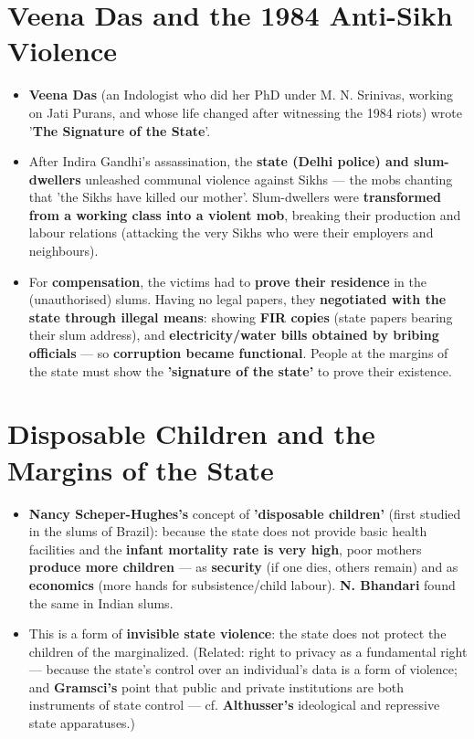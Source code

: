 \section{Veena Das and the 1984 Anti-Sikh Violence}

\begin{KeyConcept}
\begin{itemize}
\item \textbf{Veena Das} (an Indologist who did her PhD under M. N. Srinivas, working on Jati Purans, and whose life changed after witnessing the 1984 riots) wrote '\textbf{The Signature of the State}'.
\item After Indira Gandhi's assassination, the \textbf{state (Delhi police) and slum-dwellers} unleashed communal violence against Sikhs --- the mobs chanting that 'the Sikhs have killed our mother'. Slum-dwellers were \textbf{transformed from a working class into a violent mob}, breaking their production and labour relations (attacking the very Sikhs who were their employers and neighbours).
\item For \textbf{compensation}, the victims had to \textbf{prove their residence} in the (unauthorised) slums. Having no legal papers, they \textbf{negotiated with the state through illegal means}: showing \textbf{FIR copies} (state papers bearing their slum address), and \textbf{electricity/water bills obtained by bribing officials} --- so \textbf{corruption became functional}. People at the margins of the state must show the \textbf{'signature of the state'} to prove their existence.
\end{itemize}
\end{KeyConcept}

\section{Disposable Children and the Margins of the State}

\begin{KeyConcept}
\begin{itemize}
\item \textbf{Nancy Scheper-Hughes's} concept of \textbf{'disposable children'} (first studied in the slums of Brazil): because the state does not provide basic health facilities and the \textbf{infant mortality rate is very high}, poor mothers \textbf{produce more children} --- as \textbf{security} (if one dies, others remain) and as \textbf{economics} (more hands for subsistence/child labour). \textbf{N. Bhandari} found the same in Indian slums.
\item This is a form of \textbf{invisible state violence}: the state does not protect the children of the marginalized. (Related: right to privacy as a fundamental right --- because the state's control over an individual's data is a form of violence; and \textbf{Gramsci's} point that public and private institutions are both instruments of state control --- cf. \textbf{Althusser's} ideological and repressive state apparatuses.)
\end{itemize}
\end{KeyConcept}

